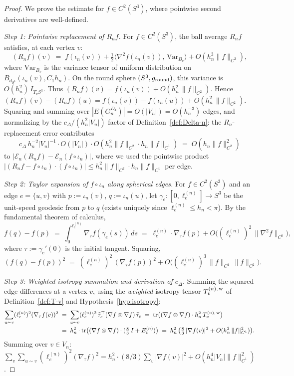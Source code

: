 \documentclass[11pt, a4paper]{amsart}
\theoremstyle{definition}
\newcommand{\dsph}{d_{S^3}}
\begin{document}
\begin{proof}
We prove the estimate for $f \in C^2(S^3)$, where pointwise
second derivatives are well-defined.

\emph{Step 1: Pointwise replacement of $R_n f$.} For $f \in
C^2(S^3)$, the ball average $R_n f$ satisfies, at each
vertex $v$:
\[
  (R_n f)(v) \;=\; f(\iota_n(v)) + \tfrac{1}{2}
    \langle \nabla^2 f(\iota_n(v)),\, \mathrm{Var}_{B_v}\rangle
    + O(h_n^3 \|f\|_{C^2}),
\]
where $\mathrm{Var}_{B_v}$ is the variance tensor of uniform
distribution on $B_{\dsph}(\iota_n(v), C_1 h_n)$. On the round
sphere $(S^3, g_{\rm round})$, this variance is
$O(h_n^2)\,I_{T_v S^3}$. Thus $(R_n f)(v) = f(\iota_n(v)) +
O(h_n^2\,\|f\|_{C^2})$. Hence
$(R_n f)(v) - (R_n f)(u) = f(\iota_n(v)) - f(\iota_n(u)) +
O(h_n^2\,\|f\|_{C^2})$. Squaring and summing over
$|E(G_n^{D_4})| = O(|V_n|) = O(h_n^{-3})$ edges, and normalizing
by the $c_\Delta/(h_n^2 |V_n|)$ factor of
Definition~\ref{def:Delta-n}: the $R_n$-replacement error
contributes
\[
  c_\Delta\,h_n^{-2} |V_n|^{-1} \cdot O(|V_n|) \cdot
    O(h_n^2 \|f\|_{C^2} \cdot h_n \|f\|_{C^1})
  \;=\; O(h_n \|f\|_{C^2}^2)
\]
to $|\mathcal E_n(R_n f) - \mathcal E_n(f \circ \iota_n)|$,
where we used the pointwise product $|(R_n f - f \circ \iota_n)
\cdot (f \circ \iota_n)| \leq h_n^2 \|f\|_{C^2} \cdot h_n
\|f\|_{C^1}$ per edge.

\emph{Step 2: Taylor expansion of $f \circ \iota_n$ along
spherical edges.} For $f \in C^2(S^3)$ and an edge $e = \{u, v\}$
with $p := \iota_n(v)$, $q := \iota_n(u)$, let
$\gamma_e \colon [0, \ell_e^{(n)}] \to S^3$ be the unit-speed
geodesic from $p$ to $q$ (exists uniquely since $\ell_e^{(n)}
\leq h_n < \pi$). By the fundamental theorem of calculus,
\[
  f(q) - f(p) \;=\; \int_0^{\ell_e^{(n)}} \nabla_\tau f(\gamma_e(s))
    \, ds \;=\; \ell_e^{(n)} \cdot \nabla_\tau f(p) +
    O\bigl((\ell_e^{(n)})^2 \,\|\nabla^2 f\|_{C^0}\bigr),
\]
where $\tau := \gamma_e'(0)$ is the initial tangent. Squaring,
\[
  (f(q) - f(p))^2 \;=\; (\ell_e^{(n)})^2\,(\nabla_\tau f(p))^2
    + O\bigl((\ell_e^{(n)})^3\,\|f\|_{C^1}\,\|f\|_{C^2}\bigr).
\]

\emph{Step 3: Weighted isotropy summation and derivation of
$c_\Delta$.} Summing the squared edge differences at a vertex
$v$, using the \emph{weighted} isotropy tensor
$T_v^{(n),\,\rm w}$ of Definition~\ref{def:T-v} and
Hypothesis~\ref{hyp:isotropy}:
\begin{align*}
  \sum_{u \sim v}(\ell_e^{(n)})^2 (\nabla_\tau f(v))^2
    &\;=\; \sum_{u \sim v}(\ell_e^{(n)})^2\,
       \widehat{\tau}_e^\top (\nabla f \otimes \nabla f)\,\widehat{\tau}_e
    \;=\; \mathrm{tr}\bigl((\nabla f \otimes \nabla f)
       \cdot h_n^2\,T_v^{(n),\,\rm w}\bigr) \\
    &\;=\; h_n^2 \cdot \mathrm{tr}\bigl((\nabla f \otimes \nabla f)
       \cdot (\tfrac{8}{3}\,I + E_v^{(n)})\bigr)
    \;=\; h_n^2\,\bigl(\tfrac{8}{3}\,|\nabla f(v)|^2 +
       O(h_n^2\,\|f\|_{C^1}^2)\bigr).
\end{align*}
Summing over $v \in V_n$:
$\sum_v \sum_{u \sim v} (\ell_e^{(n)})^2 (\nabla_\tau f)^2 =
h_n^2 \cdot (8/3) \sum_v |\nabla f(v)|^2 + O(h_n^4 |V_n|
\|f\|_{C^1}^2)$.


\end{proof}
\end{document}
